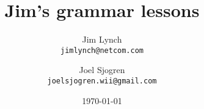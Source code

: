 \documentclass[a4paper]{memoir}
\begin{document}
\title{Jim's grammar lessons}
\author{
  Jim Lynch\\
  \texttt{jimlynch@netcom.com}
  \and
  Joel Sjogren\\
  \texttt{joelsjogren.wii@gmail.com}
}
\date{\today}
\maketitle






\end{document}
